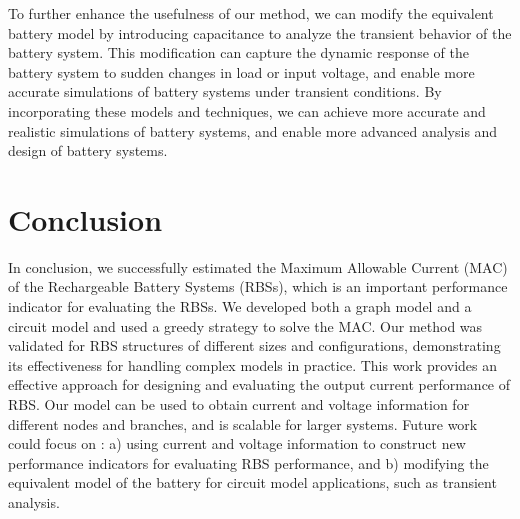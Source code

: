 \documentclass{article}
\begin{document}
To further enhance the usefulness of our method, we can modify the equivalent battery model by introducing capacitance to analyze the transient behavior of the battery system.
This modification can capture the dynamic response of the battery system to sudden changes in load or input voltage, and enable more accurate simulations of battery systems under transient conditions.
By incorporating these models and techniques, we can achieve more accurate and realistic simulations of battery systems, and enable more advanced analysis and design of battery systems.


\section{Conclusion}

In conclusion, we successfully estimated the Maximum Allowable Current (MAC) of the Rechargeable Battery Systems (RBSs), which is an important performance indicator for evaluating the RBSs.
We developed both a graph model and a circuit model and used a greedy strategy to solve the MAC.
Our method was validated for RBS structures of different sizes and configurations, demonstrating its effectiveness for handling complex models in practice.
This work provides an effective approach for designing and evaluating the output current performance of RBS.
Our model can be used to obtain current and voltage information for different nodes and branches, and is scalable for larger systems.
Future work could focus on :
a) using current and voltage information to construct new performance indicators for evaluating RBS performance, and
b) modifying the equivalent model of the battery for circuit model applications, such as transient analysis.




\end{document}
